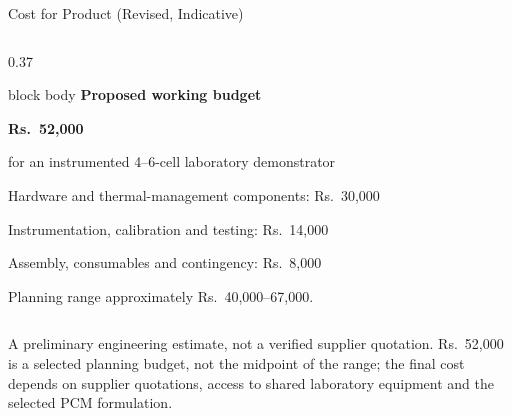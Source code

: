 \documentclass[9pt]{beamer}
\begin{document}
\begin{frame}{Cost for Product (Revised, Indicative)}
\begin{columns}[T,onlytextwidth]
\begin{column}{0.37\textwidth}
\begin{beamercolorbox}[rounded=true,sep=0.25cm,wd=\textwidth]{block body}
        \small\textbf{Proposed working budget}\par\vspace{0.08cm}
        {\Large\textbf{Rs.~52,000}}\par\vspace{0.08cm}
        \scriptsize for an instrumented 4--6-cell laboratory demonstrator\par\vspace{0.14cm}
        \scriptsize Hardware and thermal-management components: Rs.~30{,}000\par
        \scriptsize Instrumentation, calibration and testing: Rs.~14{,}000\par
        \scriptsize Assembly, consumables and contingency: Rs.~8{,}000\par\vspace{0.14cm}
        \scriptsize Planning range approximately Rs.~40{,}000--67{,}000.
      \end{beamercolorbox}
    \end{column}
  \end{columns}
  \vspace{0.12cm}
  \begin{center}
    \scriptsize A preliminary engineering estimate, not a verified supplier quotation. Rs.~52{,}000 is a selected planning budget, not the midpoint of the range; the final cost depends on supplier quotations, access to shared laboratory equipment and the selected PCM formulation.
  \end{center}
\end{frame}

\end{document}
